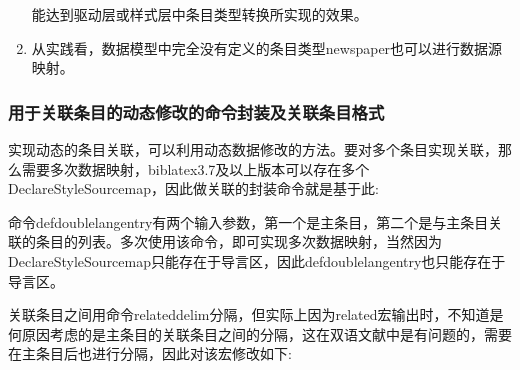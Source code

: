 \begin{enumerate}
            能达到驱动层或样式层中条目类型转换所实现的效果。
            \begin{texlist}
            \DeclareStyleSourcemap{
                \maps[datatype=bibtex]{
                    \map{%
                    \step[typesource=newspaper, typetarget=article, final]
                    }
                }
            }
            \end{texlist}

      \item 从实践看，数据模型中完全没有定义的条目类型newspaper也可以进行数据源映射。
  \end{enumerate}

\subsubsection{用于关联条目的动态修改的命令封装及关联条目格式}\label{sec:data:mdf:forrelated}

实现动态的条目关联，可以利用动态数据修改的方法。要对多个条目实现关联，那么需要多次数据映射，biblatex3.7及以上版本可以存在多个DeclareStyleSourcemap，因此做关联的封装命令就是基于此:

\begin{texlist}
    \newcommand{\defdoublelangentry}[2]{%
    \edef\entrykeya{#1}
    \edef\entrykeyb{#2}
        \DeclareStyleSourcemap{
          \maps[datatype=bibtex]{
            \map{
              \step[fieldsource=entrykey, match=\entrykeya, final]
              \step[fieldset=related, fieldvalue=\entrykeyb]
            }
          }
       }
    }
\end{texlist}

命令defdoublelangentry有两个输入参数，第一个是主条目，第二个是与主条目关联的条目的列表。多次使用该命令，即可实现多次数据映射，当然因为DeclareStyleSourcemap只能存在于导言区，因此defdoublelangentry也只能存在于导言区。

关联条目之间用命令relateddelim分隔，但实际上因为related宏输出时，不知道是何原因考虑的是主条目的关联条目之间的分隔，这在双语文献中是有问题的，需要在主条目后也进行分隔，因此对该宏修改如下:

